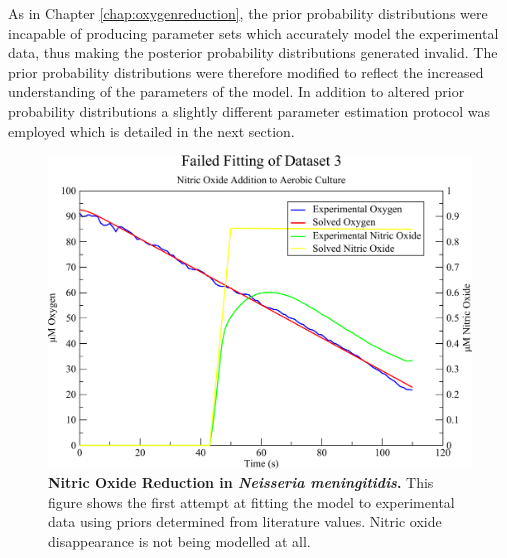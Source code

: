 As in Chapter \ref{chap:oxygenreduction}, the prior probability distributions were incapable of producing parameter sets which accurately model the experimental data, thus making the posterior probability distributions generated invalid. The prior probability distributions were therefore modified to reflect the increased understanding of the parameters of the model. In addition to altered prior probability distributions a slightly different parameter estimation protocol was employed which is detailed in the next section.

\begin{figure}[tbp]
 \centering
 \includegraphics[width=15cm, clip=true]{./06-noreduction/data/aer-no-sim1.pdf}
 \caption[{Nitric Oxide Reduction in \textit{Neisseria meningitidis}.}]{{\bf Nitric Oxide Reduction in \textit{Neisseria meningitidis}.} This figure shows the first attempt at fitting the model to experimental data using priors determined from literature values. Nitric oxide disappearance is not being modelled at all.}
 \label{fig:nosim1.1}
\end{figure}

